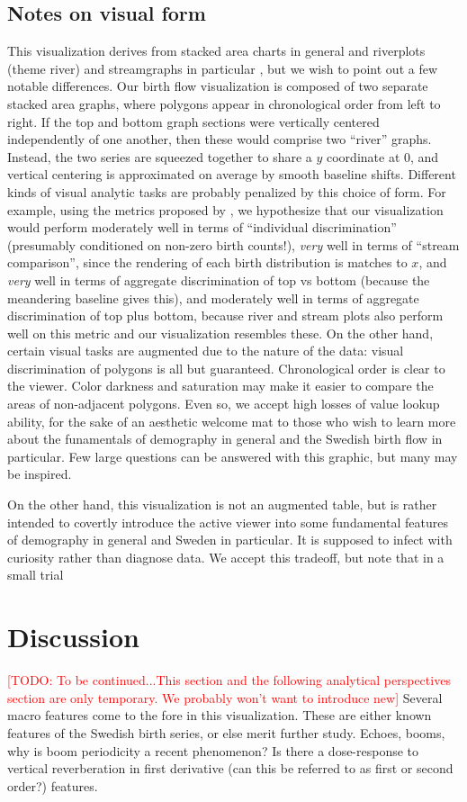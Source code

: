 \documentclass{article}
\newcommand\todo[1]{\textcolor{red}{[TODO: #1]}}
\begin{document}
\subsection{Notes on visual form}
This visualization derives from stacked area charts in general and riverplots (theme river) and streamgraphs in particular \citep{byron2008stacked}, but we wish to point out a few notable differences. Our birth flow visualization is composed of two separate stacked area graphs, where polygons appear in chronological order from left to right. If the top and bottom graph sections were vertically centered independently of one another, then these would comprise two ``river'' graphs. Instead, the two series are squeezed together to share a $y$ coordinate at 0, and vertical centering is approximated on average by smooth baseline shifts. Different kinds of visual analytic tasks are probably penalized by this choice of form. For example, using the metrics proposed by \citet{thudt2016assessing}, we hypothesize that our visualization would perform moderately well in terms of ``individual discrimination'' (presumably conditioned on non-zero birth counts!), \emph{very} well in terms of ``stream comparison'', since the rendering of each birth distribution is matches to $x$, and \emph{very} well in terms of aggregate discrimination of top vs bottom (because the meandering baseline gives this), and moderately well in terms of aggregate discrimination of top plus bottom, because river and stream plots also perform well on this metric and our visualization resembles these. On the other hand, certain visual tasks are augmented due to the nature of the data: visual discrimination of polygons is all but guaranteed. Chronological order is clear to the viewer. Color darkness and saturation may make it easier to compare the areas of non-adjacent polygons. Even so, we accept high losses of value lookup ability, for the sake of an aesthetic welcome mat to those who wish to learn more about the funamentals of demography in general and the Swedish birth flow in particular. Few large questions can be answered with this graphic, but many may be inspired.

On the other hand, this visualization is not an augmented table, but is rather intended to covertly introduce the active viewer into some fundamental features of demography in general and Sweden in particular. It is supposed to infect with curiosity rather than diagnose data. We accept this tradeoff, but note that in a small trial 


\section{Discussion}
\todo{To be continued...This section and the following analytical perspectives section are only temporary. We probably won't want to introduce new}
Several macro features come to the fore in this visualization. These are either known features of the Swedish birth series, or else merit further study. Echoes, booms, why is boom periodicity a recent phenomenon? Is there a dose-response to vertical reverberation in first derivative (can this be referred to as first or second order?) features.
\end{document}
